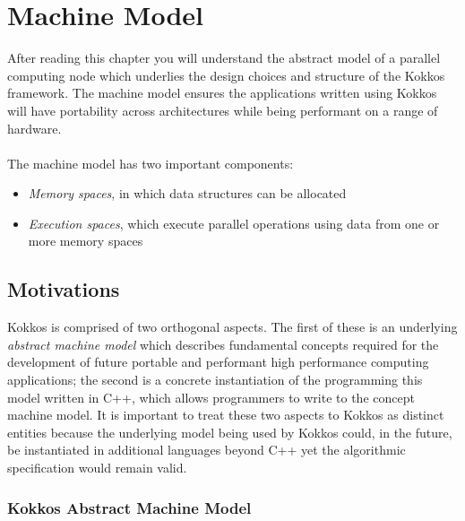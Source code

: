\section{Machine Model}
\label{C:Model}

After reading this chapter you will understand the abstract model
of a parallel computing node which underlies the design choices
and structure of the Kokkos framework. The machine model ensures
the applications written using Kokkos will have portability across
architectures while being performant on a range of hardware.\\
\\
\noindent
The machine model has two important components:
\begin{itemize}
\item \emph{Memory spaces}, in which data structures can be allocated
\item \emph{Execution spaces}, which execute parallel operations using
  data from one or more memory spaces
\end{itemize}

\subsection{Motivations}\label{S:Model:Motivations}

Kokkos is comprised of two orthogonal aspects. The first of these is 
an underlying {\em abstract machine model} which describes fundamental
concepts required for the development of future portable and performant
high performance computing applications; the second is a concrete instantiation
of the programming this model written in C++, which allows programmers
to write to the concept machine model. It is important to treat these
two aspects to Kokkos as distinct entities because the underlying model
being used by Kokkos could, in the future, be instantiated in additional
languages beyond C++ yet the algorithmic specification would remain
valid.

\subsubsection{Kokkos Abstract Machine Model}

